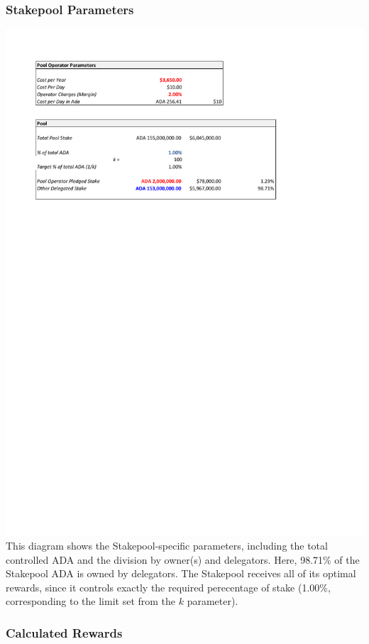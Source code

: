 \documentclass[11pt,a4paper,dvipsnames,twosided]{article}
\newcommand{\ada}{ADA{}}
\begin{document}
\subsubsection*{Stakepool Parameters}
\includegraphics[width=\textwidth]{RC2.pdf}
\noindent
This diagram shows the Stakepool-specific parameters, including the total controlled \ada{} and the
division by owner(s) and delegators.  Here, 98.71\% of the Stakepool \ada{} is owned
by delegators.  The Stakepool receives all of its optimal rewards, since it controls
exactly the required perecentage of stake (1.00\%, corresponding to the limit set from
the $k$ parameter).

\subsubsection*{Calculated Rewards}
\end{document}
